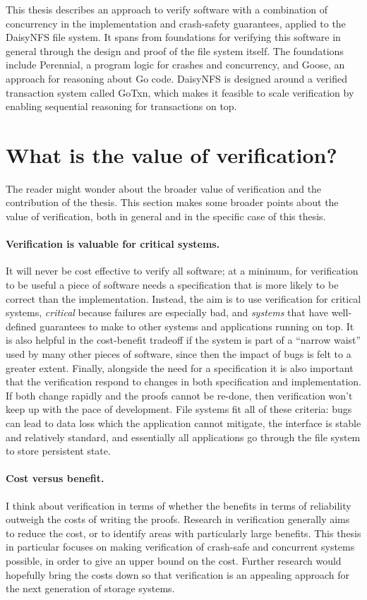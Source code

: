 This thesis describes an approach to verify software with a combination of
concurrency in the implementation and crash-safety guarantees, applied to the
DaisyNFS file system. It spans from foundations for verifying this software in
general through the design and proof of the file system itself. The foundations
include Perennial, a program logic for crashes and concurrency, and Goose, an
approach for reasoning about Go code. DaisyNFS is designed around a verified
transaction system called GoTxn, which makes it feasible to scale verification
by enabling sequential reasoning for transactions on top.

\section{What is the value of verification?}

The reader might wonder about the broader value of verification and the
contribution of the thesis. This section makes some broader points about the
value of verification, both in general and in the specific case of this thesis.

\paragraph{Verification is valuable for critical systems.} It will never be cost
effective to verify all software; at a minimum, for verification to be useful a
piece of software needs a specification that is more likely to be correct than
the implementation.
Instead, the aim is to use verification for critical systems, \emph{critical}
because failures are especially bad, and \emph{systems} that have well-defined
guarantees to make to other systems and applications running on top. It is also
helpful in the cost-benefit tradeoff if the system is part of a ``narrow waist''
used by many other pieces of software, since then the impact of bugs is felt to
a greater extent. Finally, alongside the need for a specification it is also
important that the verification respond to changes in both specification and
implementation. If both change rapidly and the proofs cannot be re-done, then
verification won't keep up with the pace of development. File systems fit all of
these criteria: bugs can lead to data loss which the application cannot
mitigate, the interface is stable and relatively standard, and essentially all
applications go through the file system to store persistent state.

\paragraph{Cost versus benefit.}
I think about verification in terms of whether the benefits in terms of
reliability outweigh the costs of writing the proofs. Research in verification
generally aims to reduce the cost, or to identify areas with particularly large
benefits. This thesis in particular focuses on making verification of crash-safe
and concurrent systems possible, in order to give an upper bound on the cost.
Further research would hopefully bring the costs down so that verification is an
appealing approach for the next generation of storage systems.

